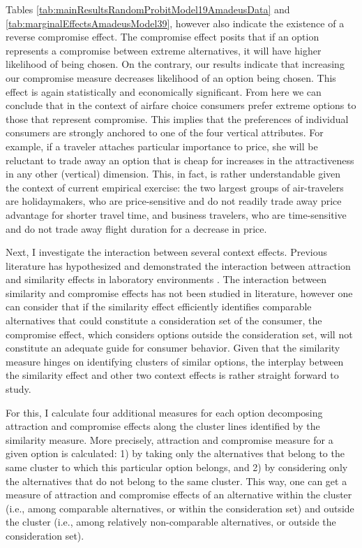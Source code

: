 \documentclass[a4paper,12pt]{article}
\begin{document}
Tables \ref{tab:mainResultsRandomProbitModel19AmadeusData} and \ref{tab:marginalEffectsAmadeusModel39}, however also indicate the existence of a reverse compromise effect. The compromise effect posits that if an option represents a compromise between extreme alternatives, it will have higher likelihood of being chosen. On the contrary, our results indicate that increasing our compromise measure decreases likelihood of an option being chosen. This effect is again statistically and economically significant. From here we can conclude that in the context of airfare choice consumers prefer extreme options to those that represent compromise. This implies that the preferences of individual consumers are strongly anchored to one of the four vertical attributes. For example, if a traveler attaches particular importance to price, she will be reluctant to trade away an option that is cheap for increases in the attractiveness in any other (vertical) dimension. This, in fact, is rather understandable given the context of current empirical exercise: the two largest groups of air-travelers are holidaymakers, who are price-sensitive and do not readily trade away price advantage for shorter travel time, and business travelers, who are time-sensitive and do not trade away flight duration for a decrease in price.

Next, I investigate the interaction between several context effects. Previous literature has hypothesized and demonstrated the interaction between attraction and similarity effects in laboratory environments \citep{huberEtAl82, huberPuto83, roodrkerkEtAl11}. The interaction between similarity and compromise effects has not been studied in literature, however one can consider that if the similarity effect efficiently identifies comparable alternatives that could constitute a consideration set of the consumer, the compromise effect, which considers options outside the consideration set, will not constitute an adequate guide for consumer behavior.  Given that the similarity measure hinges on identifying clusters of similar options, the interplay between the similarity effect and other two context effects is rather straight forward to study. 

For this, I calculate four additional measures for each option decomposing attraction and compromise effects along the cluster lines identified by the similarity measure. More precisely, attraction and compromise measure for a given option is calculated: 1) by taking only the alternatives that belong to the same cluster to which this particular option belongs, and 2) by considering only the alternatives that do not belong to the same cluster. This way, one can get a measure of attraction and compromise effects of an alternative within the cluster (i.e., among comparable alternatives, or within the consideration set) and outside the cluster (i.e., among relatively non-comparable alternatives, or outside the consideration set).
\end{document}
